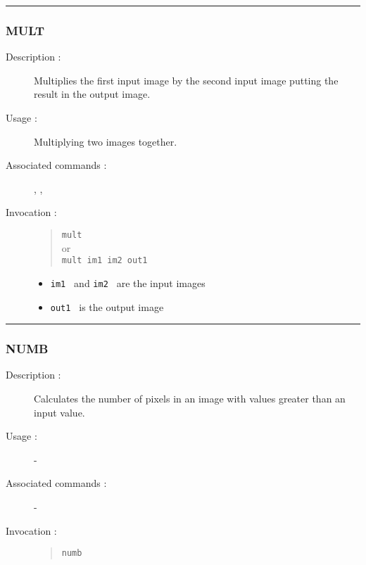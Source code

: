 \hrule
\subsubsection*{\label{MULT}MULT}

\begin{description}

\item[Description :] Multiplies the first input image by the second
input image putting the result in the output image.

\item[Usage :] Multiplying two images together.

\item[Associated commands :] {\tt {}},
{\tt {}}, {\tt {}}

\item[Invocation :]

\begin{quote}{\tt  mult }\\
or \\
{\tt mult im1 im2 out1 }
\end{quote}

\begin{itemize}

\item {\tt im1 } and {\tt im2 } are the input images
\item {\tt out1 } is the output image
\end{itemize}

\end{description}

\hrule
\subsubsection*{\label{NUMB}NUMB}

\begin{description}

\item[Description :] Calculates the number of pixels in an image with
values greater than an input value.

\item[Usage :] -
\item[Associated commands :] -
\item[Invocation :]

\begin{quote}{\tt  numb }\end{quote}

\end{description}

